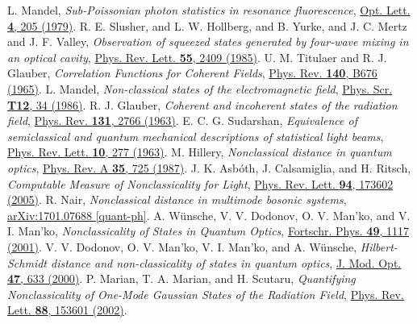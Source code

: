 \documentclass[aps,pra,twocolumn,showpacs,superscriptaddress,10pt]{revtex4-1}
\begin{document}
\begin{thebibliography}{100}
	 L. Mandel, {\it Sub-Poissonian photon statistics in resonance fluorescence}, \href{http://ol.osa.org/abstract.cfm?URI=ol-4-7-205}{Opt. Lett. {\bf 4}, 205 (1979)}.
	 R. E. Slusher, and L. W. Hollberg, and B. Yurke, and J. C. Mertz and J. F. Valley, {\it Observation of squeezed states generated by four-wave mixing in an optical cavity}, \href{http://dx.doi.org/10.1103/PhysRevLett.55.2409}{Phys. Rev. Lett. {\bf 55}, 2409 (1985)}.
	 U. M. Titulaer and R. J. Glauber, {\it Correlation Functions for Coherent Fields}, \href{http://link.aps.org/doi/10.1103/PhysRev.140.B676}{Phys. Rev. {\bf 140}, B676 (1965)}.
	 L. Mandel, {\it Non-classical states of the electromagnetic field}, \href{http://stacks.iop.org/1402-4896/1986/i=T12/a=005}{Phys. Scr. {\bf T12}, 34 (1986)}.
	 R. J. Glauber, {\it Coherent and incoherent states of the radiation field}, \href{http://dx.doi.org/10.1103/PhysRev.131.2766}{Phys. Rev. {\bf 131}, 2766 (1963)}.
%	
	 E. C. G. Sudarshan, {\it Equivalence of semiclassical and quantum mechanical descriptions of statistical light beams}, \href{http://dx.doi.org/10.1103/PhysRevLett.10.277}{Phys. Rev. Lett. {\bf 10}, 277 (1963)}.
	 M. Hillery, {\it Nonclassical distance in quantum optics}, \href{http://link.aps.org/doi/10.1103/PhysRevA.35.725}{Phys. Rev. A {\bf 35}, 725 (1987)}.
	 J. K. Asb\'{o}th, J. Calsamiglia, and H. Ritsch, {\it Computable Measure of Nonclassicality for Light}, \href{http://link.aps.org/doi/10.1103/PhysRevLett.94.173602}{Phys. Rev. Lett. {\bf 94}, 173602 (2005)}.
	 R. Nair, {\it Nonclassical distance in multimode bosonic systems}, \href{https://arxiv.org/abs/1701.07688}{arXiv:1701.07688 [quant-ph]}.
	 A. W\"{u}nsche, V. V. Dodonov, O. V. Man'ko, and V. I. Man'ko, {\it Nonclassicality of States in Quantum Optics}, \href{http://onlinelibrary.wiley.com/doi/10.1002/1521-3978(200110)49:10/11<1117::AID-PROP1117>3.0.CO;2-4/abstract}{Fortschr. Phys. {\bf 49}, 1117 (2001)}.
	 V. V. Dodonov, O. V. Man'ko, V. I. Man'ko, and A. W\"{u}nsche, {\it Hilbert-Schmidt distance and non-classicality of states in quantum optics}, \href{http://dx.doi.org/10.1080/09500340008233385}{J. Mod. Opt. {\bf 47}, 633 (2000)}.
	 P. Marian, T. A. Marian, and H. Scutaru, {\it Quantifying Nonclassicality of One-Mode Gaussian States of the Radiation Field}, \href{http://link.aps.org/doi/10.1103/PhysRevLett.88.153601}{Phys. Rev. Lett. {\bf 88}, 153601 (2002)}.

\end{thebibliography}
\end{document}
